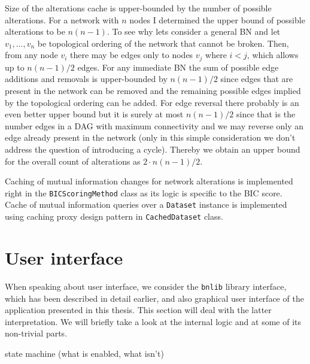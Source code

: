 \documentclass[english,cover]{fitthesis} %
\newcommand{\srccode}[1]{{\tt #1}}         %
\newcommand{\todo}[1]{{\color{red}#1}}
\begin{document}
Size of the alterations cache is upper-bounded by the number of possible alterations. For a network with $n$ nodes I determined the upper bound of possible alterations to be $n(n-1)$. To see why lets consider a general BN and let $v_1, \dots, v_n$ be topological ordering of the network that cannot be broken. Then, from any node $v_i$ there may be edges only to nodes $v_j$ where $i < j$, which allows up to $n(n-1)/2$ edges. For any immediate BN the sum of possible edge additions and removals is upper-bounded by $n(n-1)/2$ since edges that are present in the network can be removed and the remaining possible edges implied by the topological ordering can be added. For edge reversal there probably is an even better upper bound but it is surely at most $n(n-1)/2$ since that is the number edges in a DAG with maximum connectivity and we may reverse only an edge already present in the network (only in this simple consideration we don't address the question of introducing a cycle). Thereby we obtain an upper bound for the overall count of alterations as $2 \cdot n(n-1)/2$.

\medskip
Caching of mutual information changes for network alterations is implemented right in the \srccode{BICScoringMethod} class as its logic is specific to the BIC score. Cache of mutual information queries over a \srccode{Dataset} instance is implemented using caching proxy design pattern in \srccode{CachedDataset} class.




\section{User interface}
When speaking about user interface, we consider the \srccode{bnlib} library interface, which has been described in detail earlier, and also graphical user interface of the application presented in this thesis. This section will deal with the latter interpretation. We will briefly take a look at the internal logic and at some of its non-trivial parts.

\todo{state machine (what is enabled, what isn't)}
\end{document}
